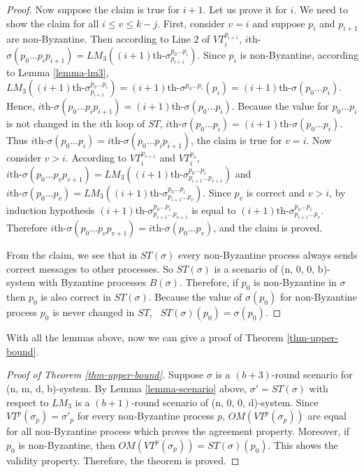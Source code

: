 \documentclass[11pt,conference,compsoc,onecolumn,romanappendices]{IEEEtran}
\begin{document}
\begin{proof}
  Now suppose the claim is true for $i + 1$. Let us prove it for $i$.
  We need to show the claim for all $i \leqslant v \leqslant k - j$.
  First, consider $v = i$ and suppose $p_i$ and $p_{i + 1}$ are non-Byzantine. Then
  according to Line $2$ of $V T_i^{p_{i + 1}}$, $i$th-$\sigma (p_0 \ldots p_i
  p_{i + 1}) = L M_3 \left( (i + 1) \text{th-} \sigma^{p_0 \ldots p_i}_{p_{i
  + 1}} \right)$. Since $p_i$ is non-Byzantine, according to Lemma \ref{lemma-lm3}, $L M_3
  \left( (i + 1) \text{th-} \sigma^{p_0 \ldots p_i}_{p_{i + 1}} \right) = (i
  + 1) \text{th-} \sigma^{p_0 \ldots p_i} (p_i) = (i + 1) \text{th-}
  \sigma (p_0 \ldots p_i)$.
  Hence, $i\text{th-}\sigma (p_0 \ldots p_i p_{i + 1}) = (i + 1) \text{th-} \sigma (p_0 \ldots p_i)$.
  Because the value for $p_0 \ldots p_i$ is not
  changed in the $i$th loop of $S T$, $i \text{th-} \sigma (p_0 \ldots p_i) = (i
  + 1) \text{th-} \sigma (p_0 \ldots p_i)$.
  Thus $i \text{th-} \sigma (p_0 \ldots p_i) = i \text{th-} \sigma (p_0 \ldots p_i p_{i + 1})$, the claim is true
  for $v = i$. Now consider $v > i$. According to $V T_i^{p_{v+1}}$ and $V
  T_i^{p_v}$, $i \text{th-} \sigma (p_0 \ldots p_v p_{v + 1}) = L M_3 \left(
  (i + 1) \text{th-} \sigma^{p_0 \ldots p_i}_{p_{i + 1} \ldots p_{v + 1}}
  \right)$ and $i \text{th-} \sigma (p_0 \ldots p_v) = L M_3 \left( (i + 1)
  \text{th-} \sigma^{p_0 \ldots p_i}_{p_{i + 1} \ldots p_v} \right)$. Since
  $p_v$ is correct and $v > i$, by induction hypothesis $(i + 1) \text{th-}
  \sigma^{p_0 \ldots p_i}_{p_{i + 1} \ldots p_{v + 1}}$ is equal to $(i + 1)
  \text{th-} \sigma^{p_0 \ldots p_i}_{p_{i + 1} \ldots p_v}$. Therefore
  $i$th-$\sigma (p_0 \ldots p_v p_{v + 1}) = i \text{th-} \sigma (p_0 \ldots
  p_v)$, and the claim is proved.
  
  From the claim, we see that in $S T (\sigma)$ every non-Byzantine process
  always sends correct messages to other processes.
  So $S T (\sigma)$ is a scenario of
  (n, 0, 0, b)-system with Byzantine processes $B(\sigma)$. Therefore, if $p_0$ is
  non-Byzantine in $\sigma$ then $p_0$ is also correct in $S T (\sigma)$. Because
  the value of $\sigma (p_0)$ for non-Byzantine process $p_0$ is never changed in $S T$, \
  $S T (\sigma) (p_0) = \sigma (p_0)$.
\end{proof}

With all the lemmas above, now we can give a proof of Theorem \ref{thm-upper-bound}.

\begin{proof}[Proof of Theorem \ref{thm-upper-bound}]
  Suppose $\sigma$ is a $(b + 3)$-round scenario for (n, m, d, b)-system. By
  Lemma \ref{lemma-scenario} above, $\sigma' = S T (\sigma)$ with respect to $L M_3$ is a $(b +
  1)$-round scenario of (n, 0, 0, d)-system. Since $V T^p (\sigma_p) =
  \sigma'_p$ for every non-Byzantine process $p$, $O M (V T^p (\sigma_p))$ are equal
  for all non-Byzantine process which proves the agreement property. Moreover,
  if $p_0$ is non-Byzantine, then $O M (V T^p (\sigma_p)) = S T (\sigma) (p_0)$.
  This shows the validity property. Therefore, the theorem is proved.
\end{proof}
\end{document}
